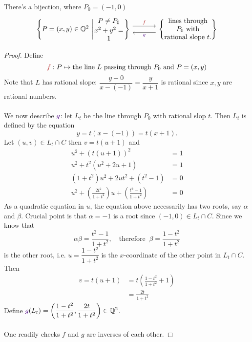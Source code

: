 \begin{proposition}
There's a bijection, where $P_0 = (-1,0)$
\[\begin{tikzcd}
\set{P = (x,y) \in \qq^2\ \Bigg\vert \begin{minipage}{0.13\textwidth}
\begin{center}
$P \neq P_0$\\[0.2em] $x^2 + y^2 = 1$
\end{center}
\end{minipage}}
 \arrow[r,shift left=2,"{\color{firebrick}f}"] &[1em]  \arrow[l,shift left=2,"{\color{indigo}g}"] \set{\begin{minipage}{0.2\textwidth}
\begin{center}
lines through $P_0$ with rational slope $t$.
\end{center}
\end{minipage}}
\end{tikzcd}\]
\end{proposition}
\begin{proof}
Define
\[{\color{firebrick}f}:P \mapsto \text{the line $L$ passing through $P_0$ and $P = (x,y)$}\]
Note that $L$ has rational slope: $\dfrac{y - 0}{x - (-1)} = \dfrac{y}{x+1}$ is rational since $x,y$ are rational numbers.\\
\\
We now describe ${\color{indigo}g}$: let $L_t$ be the line through $P_0$ with rational slop $t$. Then $L_t$ is defined by the equation \[y = t(x-(-1)) = t(x+1).\]
Let $(u,v) \in L_t \cap C$ then $v = t(u+1)$ and
\begin{align*}
u^2 + (t(u+1))^2 &= 1\\[0.5em]
u^2 + t^2(u^2 + 2u + 1) &= 1\\[0.5em]
(1+t^2)u^2 + 2ut^2 + (t^2 - 1) &= 0\\[0.5em]
u^2 + \left(\frac{2t^2}{1+t^2}\right)u + \left(\frac{t^2-1}{1+t^2}\right) &= 0
\end{align*}
As a quadratic equation in $u$, the equation above necessarily has two roots, say $\alpha$ and $\beta$. Crucial point is that $\alpha = -1$ is a root since $(-1,0) \in L_t\cap C$. Since we know that
\[\alpha\beta = \frac{t^2-1}{1+t^2},\quad \text{therefore }\ \beta = \frac{1-t^2}{1+t^2}\]
is the other root, i.e. $u = \dfrac{1-t^2}{1+t^2}$ is the $x$-coordinate of the other point in $L_t \cap C$. Then
\begin{align*}
v = t(u+1) &= t\left(\frac{1-t^2}{1+t^2} + 1\right)\\[0.5em]
&= \frac{2t}{1+t^2}
\end{align*}
Define ${\color{indigo}g}(L_t) = \left(\dfrac{1-t^2}{1+t^2},\dfrac{2t}{1+t^2}\right) \in \qq^2$.\\
\\[0.5em]
One readily checks $f$ and $g$ are inverses of each other.
\end{proof}

